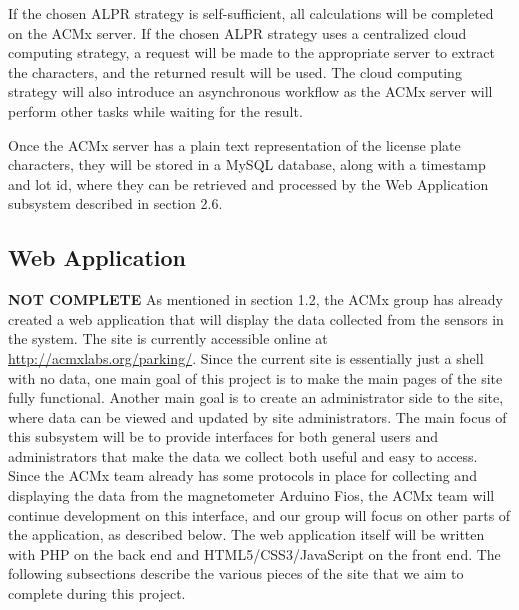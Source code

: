 \documentclass[11pt, oneside, fullpage, doublespace]{article}
\begin{document}
If the chosen ALPR strategy is self-sufficient, all calculations will be completed on the ACMx server. If the chosen ALPR strategy uses a centralized cloud computing strategy, a request will be made to the appropriate server to extract the characters, and the returned result will be used. The cloud computing strategy will also introduce an asynchronous workflow as the ACMx server will perform other tasks while waiting for the result.

Once the ACMx server has a plain text representation of the license plate characters, they will be stored in a MySQL database, along with a timestamp and lot id, where they can be retrieved and processed by the Web Application subsystem described in section 2.6.

\subsection{Web Application}
{\color{red}\textbf{NOT COMPLETE}}
As mentioned in section 1.2, the ACMx group has already created a web application that will display the data collected from the sensors in the system. The site is currently accessible online at \url{http://acmxlabs.org/parking/}. Since the current site is essentially just a shell with no data, one main goal of this project is to make the main pages of the site fully functional. Another main goal is to create an administrator side to the site, where data can be viewed and updated by site administrators. The main focus of this subsystem will be to provide interfaces for both general users and administrators that make the data we collect both useful and easy to access. Since the ACMx team already has some protocols in place for collecting and displaying the data from the magnetometer Arduino Fios, the ACMx team will continue development on this interface, and our group will focus on other parts of the application, as described below. The web application itself will be written with PHP on the back end and HTML5/CSS3/JavaScript on the front end. The following subsections describe the various pieces of the site that we aim to complete during this project.
\end{document}

